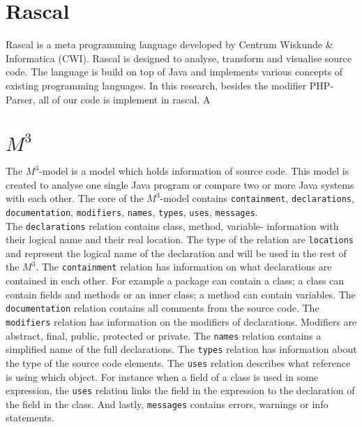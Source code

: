 \documentclass[../main.tex]{subfiles}
\begin{document}
    \section{Rascal}\label{sec:background_rascal}
    \Gls{Rascal} is a meta programming language developed by Centrum Wiskunde \& Informatica (CWI)\cite{Kli:09}.
    Rascal is designed to analyse, transform and visualise source code.
    The language is build on top of Java and implements various concepts of existing programming languages.
    In this research, besides the modifier PHP-Parser, all of our code is implement in rascal.
    A

    \section{$M^3$}\label{sec:background_m3}
    The $M^3$-model\cite{Ana:13} is a model which holds information of source code.
    This model is created to analyse one single Java program or compare two or more Java systems with each other.
    The core of the $M^3$-model contains \texttt{containment}, \texttt{declarations}, \texttt{documentation}, \texttt{modifiers}, \texttt{names}, \texttt{types}, \texttt{uses}, \texttt{messages}.
    \\
    The \texttt{declarations} relation contains class, method, variable- information with their logical name and their real location. The type of the relation are \texttt{locations} and represent the logical name of the declaration and will be used in the rest of the $M^3$.
    The \texttt{containment} relation has information on what declarations are contained in each other. For example a package can contain a class; a class can contain fields and methods or an inner class; a method can contain variables.    
    The \texttt{documentation} relation contains all comments from the source code. 
    The \texttt{modifiers} relation has information on the modifiers of declarations. Modifiers are abstract, final, public, protected or private.
    The \texttt{names} relation contains a simplified name of the full declarations.
    The \texttt{types} relation has information about the type of the source code elements.
    The \texttt{uses} relation describes what reference is using which object. For instance when a field of a class is used in some expression, the \texttt{uses} relation links the field in the expression to the declaration of the field in the class.
    And lastly, \texttt{messages} contains errors, warnings or info statements.
    
\end{document}
